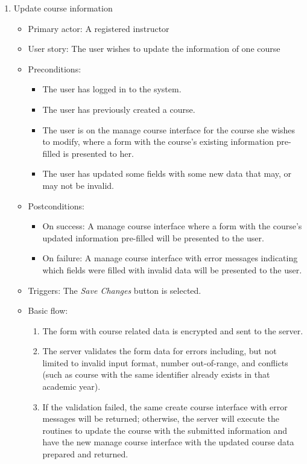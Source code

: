 \begin{enumerate}
\item Update course information
\begin{itemize}
    \item Primary actor: A registered instructor
    \item User story: The user wishes to update the information of one course
    \item Preconditions:
        \begin{itemize}
            \item The user has logged in to the system.
            \item The user has previously created a course.
            \item The user is on the manage course interface for the course she
                wishes to modify, where a form with
                the course's existing information pre-filled is presented to
                her.
            \item The user has updated some fields with some new data that may,
                or may not be invalid.
        \end{itemize}
    \item Postconditions:
        \begin{itemize}
            \item On success: A manage course interface where a form with
                the course's updated information pre-filled will be presented
                to the user.
            \item On failure: A manage course interface with error messages
                indicating which fields were filled with invalid data will be
                presented to the user.
        \end{itemize}
    \item Triggers: The \emph{Save Changes} button is selected.
    \item Basic flow:
        \begin{enumerate}
            \item The form with course related data is encrypted and sent to
                the server.
            \item The server validates the form data for errors including,
                but not limited to invalid input format, number out-of-range,
                and conflicts (such as course with the same identifier  
                already exists in that academic year).
            \item If the validation failed, the same create course interface
                with error messages will be returned; otherwise, the server will
                execute the routines to update the course with the submitted 
                information and have the new manage course interface with the
                updated course data prepared and returned.
        \end{enumerate}
\end{itemize}


\end{enumerate}
